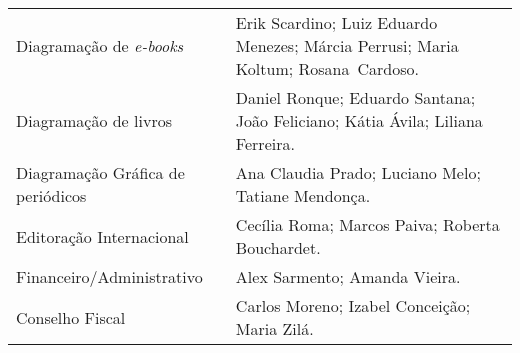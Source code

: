 \documentclass{gescons}
\begin{document}
\begin{longtable}[]{@{}
  >{\raggedright\arraybackslash}p{}
  >{\raggedright\arraybackslash}p{}@{}}
\begin{minipage}[b]{\linewidth}
\end{minipage} \\
\hline
\begin{minipage}[b]{\linewidth}\raggedright
Diagramação de \emph{e-books}
\end{minipage} & \begin{minipage}[b]{\linewidth}\raggedright\addlinespace[4pt]
Erik Scardino; Luiz Eduardo Menezes; Márcia Perrusi; Maria Koltum; Rosana~Cardoso.
\end{minipage} \\
\hline
\begin{minipage}[b]{\linewidth}\raggedright
Diagramação de livros
\end{minipage} & \begin{minipage}[b]{\linewidth}\raggedright
Daniel Ronque; Eduardo Santana; João Feliciano; Kátia Ávila; Liliana Ferreira.
\end{minipage} \\
\hline
\begin{minipage}[b]{\linewidth}\raggedright
Diagramação Gráfica de periódicos
\end{minipage} & \begin{minipage}[b]{\linewidth}\raggedright
Ana Claudia Prado; Luciano Melo; Tatiane Mendonça.
\end{minipage} \\
\hline
\begin{minipage}[b]{\linewidth}\raggedright
Editoração Internacional
\end{minipage} & \begin{minipage}[b]{\linewidth}\raggedright
Cecília Roma; Marcos Paiva; Roberta Bouchardet.
\end{minipage} \\
\hline
\begin{minipage}[b]{\linewidth}\raggedright
Financeiro/Administrativo
\end{minipage} & \begin{minipage}[b]{\linewidth}\raggedright\addlinespace[2pt]
Alex Sarmento; Amanda Vieira.
\end{minipage} \\
\hline
\begin{minipage}[b]{\linewidth}\raggedright
Conselho Fiscal
\end{minipage} & \begin{minipage}[b]{\linewidth}\raggedright\addlinespace[2pt]
Carlos Moreno; Izabel Conceição; Maria Zilá.
\end{minipage} \\

\end{longtable}
\end{document}
